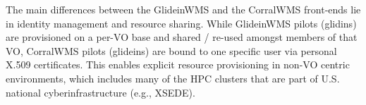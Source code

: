 \documentclass{sig-alternate}
\begin{document}
The main differences between the GlideinWMS and the CorralWMS front-ends lie in
identity management and resource sharing. While GlideinWMS pilots (glidins) are
provisioned on a per-VO base and shared / re-used amongst members of that VO,
CorralWMS pilots (glideins) are bound to one specific user via personal  X.509
certificates. This enables explicit resource provisioning in non-VO centric
environments, which includes many of the HPC clusters that are part of U.S.
national cyberinfrastructure (e.g., XSEDE).


%



\end{document}
